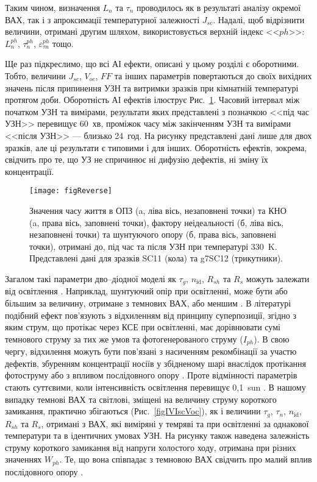 Таким чином, визначення $L_n$ та $\tau_n$ проводилось як в результаті аналізу окремої ВАХ, так і з апроксимації
температурної залежності $J_{sc}$.
Надалі, щоб відрізнити величини, отримані другим шляхом, використовується верхній індекс <<$ph$>>: $L_n^{ph}$, $\tau_n^{ph}$, $\varepsilon_{\tau n}^{ph}$ тощо.

Ще раз підкреслимо, що всі АІ ефекти, описані у цьому розділі є оборотними.
Тобто, величини $J_{sc}$, $V_{oc}$, $F\!F$ та інших параметрів повертаються до своїх вихідних значень
після припинення УЗН  та витримки зразків при кімнатній температурі протягом доби.
Оборотність АІ ефектів ілюструє Рис.~\ref{figReverse}.
Часовий інтервал між початком УЗН та вимірами, результати яких представлені з позначкою <<під час УЗН>>
перевищує 60~хв, проміжок часу між закінченням УЗН та вимірами <<після УЗН>> --- близько 24~год.
На рисунку представлені дані лише для двох зразків, але ці результати є типовими і для інших.
Оборотність ефектів, зокрема, свідчить про те, що УЗ не спричинює ні дифузію дефектів,
ні зміну їх концентрації.

\begin{figure}
\center
\texttt{[image: figReverse]}%
\caption{\label{figReverse}
Значення часу життя в ОПЗ (a, ліва вісь, незаповнені точки)
та КНО (a, права вісь, заповнені точки),
фактору неідеальності (б, ліва вісь, незаповнені точки) та
шунтуючого опору (б, права вісь, заповнені точки),
отримані до, під час та після УЗН при температурі 330~K.
Представлені дані для зразків SC11 (кола) та g7SC12 (трикутники).
}%
\end{figure}

Загалом такі параметри дво--діодної моделі як $\tau_g$, $n_{\mathrm{id}}$, $R_{sh}$ та $R_s$ можуть залежати від освітлення \cite{Iph:KHAN2010,Breitenstein2013,SUGIANTO2009}.
Наприклад, шунтуючий опір при освітленні, може бути або більшим за величину, отримане з темнових ВАХ\cite{Iph:KHAN2010}, або меншим \cite{Breitenstein2013,SUGIANTO2009}.
В літературі \cite{Breitenstein2013} подібний ефект пов'язують з відхиленням від принципу суперпозиції,
згідно з яким струм, що протікає через КСЕ при освітленні, має дорівнювати сумі темнового струму за тих же умов та фотогенерованого струму ($I_{ph}$).
В свою чергу, відхилення можуть бути пов'язані з насиченням рекомбінації за участю дефектів,
збуренням концентрації носіїв у збідненому шарі внаслідок протікання фотоструму \cite{Robinson} або з впливом послідовного опору \cite{Rs:BREITENSTEIN2013}.
Проте відмінності параметрів стають суттєвими, коли інтенсивність освітлення перевищує 0,1~sun \cite{Breitenstein2013}.
В нашому випадку темнові ВАХ та світлові, зміщені на величину струму короткого замикання, практично збігаються (Рис.~\ref{figIVIscVoc}),
як і величини $\tau_g$, $\tau_n$, $n_{\mathrm{id}}$, $R_{sh}$ та $R_s$, отримані з ВАХ, які виміряні у темряві та при освітленні за однакової температури
та в ідентичних умовах УЗН.
На рисунку також наведена залежність струму короткого замикання від напруги холостого ходу, отримана при різних значеннях $W_{ph}$.
Те, що вона співпадає з темновою ВАХ свідчить про малий вплив послідовного опору \cite{Robinson}.

